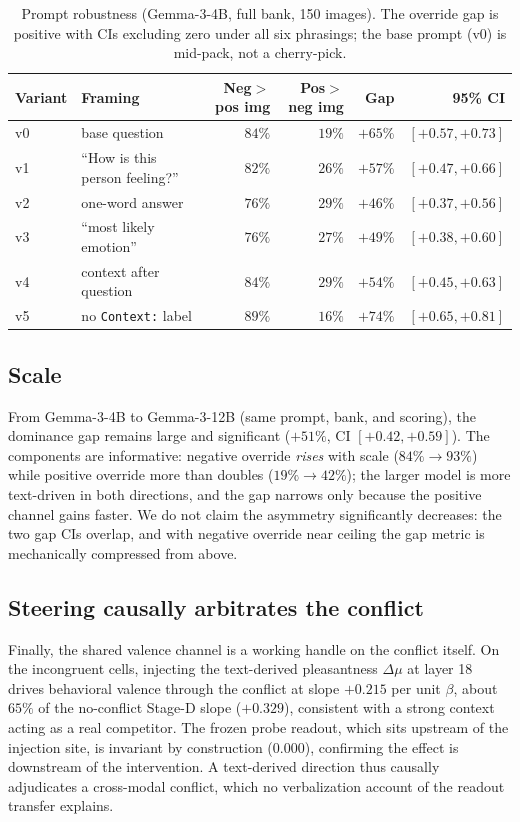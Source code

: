 \documentclass{article}
\newcommand{\gemma}{Gemma-3-4B}
\newcommand{\gemmabig}{Gemma-3-12B}
\begin{document}
\begin{table}[t]
  \caption{Prompt robustness (\gemma{}, full bank, 150 images). The override gap is positive with CIs excluding zero under all six phrasings; the base prompt (v0) is mid-pack, not a cherry-pick.}
  \label{tab:prompts}
  \centering
  \small
  \begin{tabular}{llrrrr}
    \toprule
    Variant & Framing & Neg$>$pos img & Pos$>$neg img & Gap & 95\% CI \\
    \midrule
    v0 & base question & $84\%$ & $19\%$ & $+65\%$ & $[+0.57, +0.73]$ \\
    v1 & ``How is this person feeling?'' & $82\%$ & $26\%$ & $+57\%$ & $[+0.47, +0.66]$ \\
    v2 & one-word answer & $76\%$ & $29\%$ & $+46\%$ & $[+0.37, +0.56]$ \\
    v3 & ``most likely emotion'' & $76\%$ & $27\%$ & $+49\%$ & $[+0.38, +0.60]$ \\
    v4 & context after question & $84\%$ & $29\%$ & $+54\%$ & $[+0.45, +0.63]$ \\
    v5 & no \texttt{Context:} label & $89\%$ & $16\%$ & $+74\%$ & $[+0.65, +0.81]$ \\
    \bottomrule
  \end{tabular}
\end{table}

\subsection{Scale}
\label{sec:scale}

From \gemma{} to \gemmabig{} (same prompt, bank, and scoring), the dominance gap remains large and significant ($+51\%$, CI $[+0.42, +0.59]$). The components are informative: negative override \emph{rises} with scale ($84\% \to 93\%$) while positive override more than doubles ($19\% \to 42\%$); the larger model is more text-driven in both directions, and the gap narrows only because the positive channel gains faster. We do not claim the asymmetry significantly decreases: the two gap CIs overlap, and with negative override near ceiling the gap metric is mechanically compressed from above.

\subsection{Steering causally arbitrates the conflict}
\label{sec:arbitration}

Finally, the shared valence channel is a working handle on the conflict itself. On the incongruent cells, injecting the text-derived pleasantness $\Delta\mu$ at layer 18 drives behavioral valence through the conflict at slope $+0.215$ per unit $\beta$, about $65\%$ of the no-conflict Stage-D slope ($+0.329$), consistent with a strong context acting as a real competitor. The frozen probe readout, which sits upstream of the injection site, is invariant by construction ($0.000$), confirming the effect is downstream of the intervention. A text-derived direction thus causally adjudicates a cross-modal conflict, which no verbalization account of the readout transfer explains.
\end{document}

